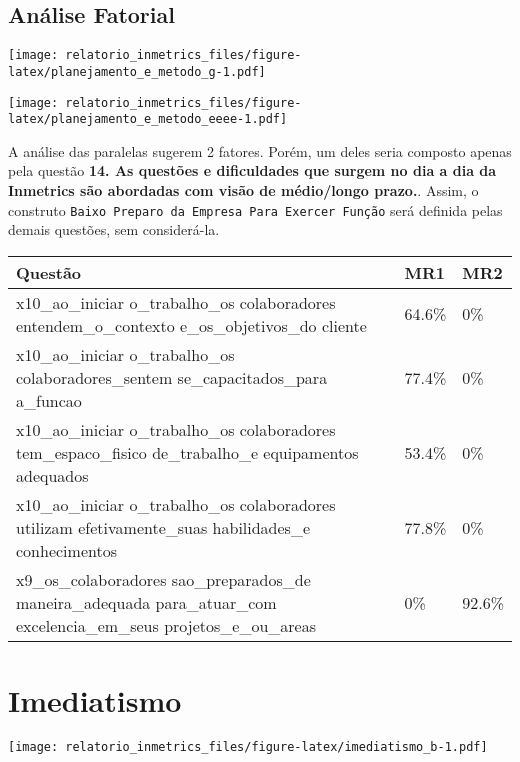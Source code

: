 \documentclass[]{book}
\begin{document}
\hypertarget{analise-fatorial-3}{%
\subsection{Análise Fatorial}\label{analise-fatorial-3}}

\texttt{[image: relatorio\_inmetrics\_files/figure-latex/planejamento\_e\_metodo\_g-1.pdf]}

\texttt{[image: relatorio\_inmetrics\_files/figure-latex/planejamento\_e\_metodo\_eeee-1.pdf]}

A análise das paralelas sugerem 2 fatores. Porém, um deles seria composto apenas pela questão \textbf{14. As questões e dificuldades que surgem no dia a dia da Inmetrics são abordadas com visão de médio/longo prazo.}. Assim, o construto \texttt{Baixo\ Preparo\ da\ Empresa\ Para\ Exercer\ Função} será definida pelas demais questões, sem considerá-la.

\begin{table}[H]
\centering\begingroup\fontsize{12}{14}\selectfont

\begin{tabular}{>{\raggedright\arraybackslash}p{20em}ll}
\toprule
Questão & MR1 & MR2\\
\midrule
x10\_ao\_iniciar
o\_trabalho\_os
colaboradores
entendem\_o\_contexto
e\_os\_objetivos\_do
cliente & 64.6\% & 0\%\\
x10\_ao\_iniciar
o\_trabalho\_os
colaboradores\_sentem
se\_capacitados\_para
a\_funcao & 77.4\% & 0\%\\
x10\_ao\_iniciar
o\_trabalho\_os
colaboradores
tem\_espaco\_fisico
de\_trabalho\_e
equipamentos
adequados & 53.4\% & 0\%\\
x10\_ao\_iniciar
o\_trabalho\_os
colaboradores
utilizam
efetivamente\_suas
habilidades\_e
conhecimentos & 77.8\% & 0\%\\
x9\_os\_colaboradores
sao\_preparados\_de
maneira\_adequada
para\_atuar\_com
excelencia\_em\_seus
projetos\_e\_ou\_areas & 0\% & 92.6\%\\
\bottomrule
\end{tabular}
\endgroup{}
\end{table}

\hypertarget{imediatismo}{%
\section{Imediatismo}\label{imediatismo}}

\texttt{[image: relatorio\_inmetrics\_files/figure-latex/imediatismo\_b-1.pdf]}
\end{document}
